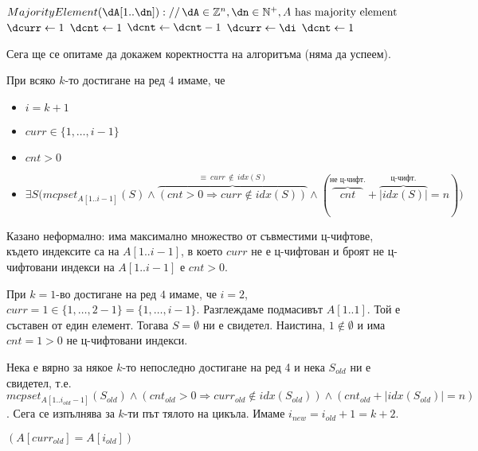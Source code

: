 \begin{solution}
\begin{pseudocode}
		$MajorityElement(\dA[1..\dn])://\,\dA\in\mathbb{Z}^n,\dn\in\mathbb{N}^+,A\text{ has majority element}$
		\Mybegin
		{	
			$\dcurr\leftarrow1$\;
			$\dcnt\leftarrow1$\;
			{
				\Else
				{
					$\dcnt\leftarrow\dcnt-1$\;
					{
						$\dcurr\leftarrow\di$\;
						$\dcnt\leftarrow1$\;
					}
				}
			}
			\KwRet{$\dA[\dcurr]$\;}
		}
	\end{pseudocode}
	Сега ще се опитаме да докажем коректността на алгоритъма (няма да успеем).
	\begin{boxinvariant*}{}{}
		При всяко $k$-то достигане на ред $4$ имаме, че
		\begin{itemize}
			\item $i=k+1$
			\item $curr\in\{1,\dots,i-1\}$
			\item $cnt>0$
			\vspace{-0.4cm}
			\item $\exists S\big(mcpset_{A[1..i-1]}(S)\land\overbrace{(cnt>0\Rightarrow curr\notin idx(S))}^{\equiv\ curr\,\notin\, idx(S)}\land(\overbrace{\ \ \ cnt\ \ \ }^{\text{не ц-чифт.}}+\overbrace{|idx(S)|}^{\text{ц-чифт.}}=n)\big)$
		\end{itemize}
	\end{boxinvariant*}
	\begin{remark*}
		Казано неформално: има максимално множество от съвместими ц-чифтове, където индексите са на $A[1..i-1]$, в което $curr$ не е ц-чифтован и броят не ц-чифтовани индекси на $A[1..i-1]$ е $cnt>0$.
	\end{remark*}
	\begin{base}
		При $k=1$-во достигане на ред $4$ имаме, че $i=2$, $curr\!=\!1\!\in\!\{1,\dots,2-1\}\!=\!\{1,\dots,i-1\}$. Разглеждаме подмасивът $A[1..1]$. Той е съставен от един елемент. Тогава $S=\emptyset$ ни е свидетел. Наистина, $1\notin\emptyset$ и има $cnt=1>0$ не ц-чифтовани индекси. 
	\end{base}
	\begin{maintenance}
		Нека е вярно за някое $k$-то непоследно достигане на ред 4 и нека $S_{old}$ ни е свидетел, т.е. $mcpset_{A[1..i_{old}-1]}(S_{old})\land(cnt_{old}>0\Rightarrow curr_{old}\notin idx(S_{old}))\land(cnt_{old}+|idx(S_{old})|=n)$. Сега се изпълнява за $k$-ти път тялото на цикъла. Имаме $i_{new}=i_{old}+1=k+2$.
		\begin{mycase}
			\item $(A[curr_{old}]=A[i_{old}])$


\end{mycase}
\end{maintenance}
\end{solution}
